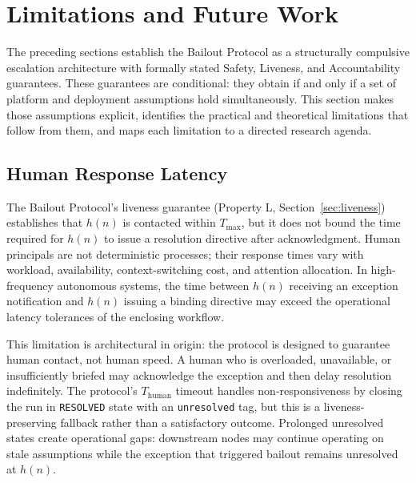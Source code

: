 \section{Limitations and Future Work}
\label{sec:limitations}

The preceding sections establish the Bailout Protocol as a structurally compulsive escalation architecture with formally stated Safety, Liveness, and Accountability guarantees. These guarantees are conditional: they obtain if and only if a set of platform and deployment assumptions hold simultaneously. This section makes those assumptions explicit, identifies the practical and theoretical limitations that follow from them, and maps each limitation to a directed research agenda.

\subsection{Human Response Latency}
\label{sec:human-latency}

The Bailout Protocol's liveness guarantee (Property L, Section~\ref{sec:liveness}) establishes that $h(n)$ is contacted within $T_{\max}$, but it does not bound the time required for $h(n)$ to issue a resolution directive after acknowledgment. Human principals are not deterministic processes; their response times vary with workload, availability, context-switching cost, and attention allocation. In high-frequency autonomous systems, the time between $h(n)$ receiving an exception notification and $h(n)$ issuing a binding directive may exceed the operational latency tolerances of the enclosing workflow.

This limitation is architectural in origin: the protocol is designed to guarantee human contact, not human speed. A human who is overloaded, unavailable, or insufficiently briefed may acknowledge the exception and then delay resolution indefinitely. The protocol's $T_{\text{human}}$ timeout handles non-responsiveness by closing the run in \texttt{RESOLVED} state with an \texttt{unresolved} tag, but this is a liveness-preserving fallback rather than a satisfactory outcome. Prolonged unresolved states create operational gaps: downstream nodes may continue operating on stale assumptions while the exception that triggered bailout remains unresolved at $h(n)$.


